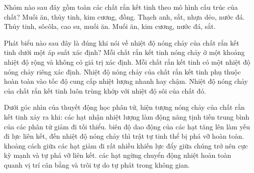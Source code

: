 \begin{ex}
Nhóm nào sau đây gồm toàn các chất rắn kết tinh theo mô hình cấu trúc của chất?
\choice
{Muối ăn, thủy tinh, kim cương, đồng.}
{Thạch anh, sắt, nhựa dẻo, nước đá.}
{Thủy tinh, sôcôla, cao su, muối ăn.}
{\True Muối ăn, kim cương, nước đá, sắt.}
\end{ex}

\begin{ex}
Phát biểu nào sau đây là đúng khi nói về nhiệt độ nóng chảy của chất rắn kết tinh dưới một áp suất xác định?
\choice
{Mỗi chất rắn kết tinh nóng chảy ở một khoảng nhiệt độ rộng và không có giá trị xác định.}
{\True Mỗi chất rắn kết tinh có một nhiệt độ nóng chảy riêng xác định.}
{Nhiệt độ nóng chảy của chất rắn kết tinh phụ thuộc hoàn toàn vào tốc độ cung cấp nhiệt lượng nhanh hay chậm.}
{Nhiệt độ nóng chảy của chất rắn kết tinh luôn trùng khớp với nhiệt độ sôi của chất đó.}
\end{ex}

\begin{ex}
Dưới góc nhìn của thuyết động học phân tử, hiện tượng nóng chảy của chất rắn kết tinh xảy ra khi:
\choice
{các hạt nhận nhiệt lượng làm động năng tịnh tiến trung bình của các phân tử giảm đi tối thiểu.}
{\True biên độ dao động của các hạt tăng lên làm yếu đi lực liên kết, đến nhiệt độ nóng chảy thì trật tự tinh thể bị phá vỡ hoàn toàn.}
{khoảng cách giữa các hạt giảm đi rất nhiều khiến lực đẩy giữa chúng trở nên cực kỳ mạnh và tự phá vỡ liên kết.}
{các hạt ngừng chuyển động nhiệt hoàn toàn quanh vị trí cân bằng và trôi tự do tự phát trong không gian.}
\end{ex}

